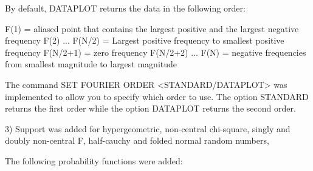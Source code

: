 {      By default, DATAPLOT returns the data in the following order:

         F(1)              = aliased point that contains the largest
                             positive and the largest negative frequency
         F(2) ... F(N/2)   = Largest positive frequency to smallest
                             positive frequency
         F(N/2+1)          = zero frequency
         F(N/2+2) ... F(N) = negative frequencies from smallest
                             magnitude to largest magnitude

      The command SET FOURIER ORDER <STANDARD/DATAPLOT> was 
      implemented to allow you to specify which order to use.
      The option STANDARD returns the first order while the option
      DATAPLOT returns the second order.

 3) Support was added for hypergeometric, non-central chi-square,
    singly and doubly non-central F, half-cauchy and folded normal
    random numbers, 

    The following probability functions were added:

}
